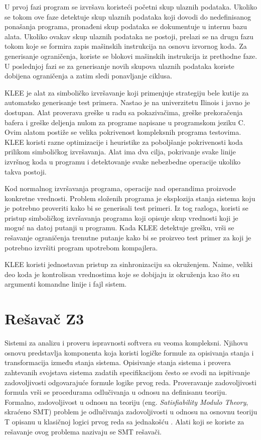 \documentclass[12pt,oneside]{memoir}
\begin{document}
U prvoj fazi program se izvršava koristeći početni skup ulaznih podataka. Ukoliko se tokom ove faze detektuje skup ulaznih podataka koji dovodi do nedefinisanog ponašanja programa, pronađeni skup podataka se dokumentuje u internu bazu alata. Ukoliko ovakav skup ulaznih podataka ne postoji, prelazi se na drugu fazu tokom koje se formira zapis mašinskih instrukcija na osnovu izvornog koda. Za generisanje ograničenja, koriste se blokovi mašinskih instrukcija iz prethodne faze. U poslednjoj fazi se za generisanje novih skupova ulaznih podataka koriste dobijena ograničenja a zatim sledi ponavljanje ciklusa. 
\par
KLEE \cite{ToolKLEE} je alat za simboličko izvršavanje \cite{SymbolicExecution} koji primenjuje strategiju bele kutije za automatsko generisanje test primera. 
Nastao je na univerzitetu Ilinois i javno je dostupan.
Alat proverava greške u radu sa pokazivačima, greške prekoračenja bafera i greške deljenja nulom za programe napisane u programskom jeziku C. Ovim alatom postiže se velika pokrivenost kompleksnih programa testovima. KLEE koristi razne optimizacije i heuristike za poboljšanje pokrivenosti koda prilikom simboličkog izvršavanja. Alat ima dva cilja, pokrivanje svake linije izvršnog koda u programu i detektovanje svake nebezbedne operacije ukoliko takva postoji. \par
Kod normalnog izvršavanja programa, operacije nad operandima proizvode konkretne vrednosti. Problem složenih programa je eksplozija stanja sistema koju je potrebno proveriti kako bi se generisali test primeri. Iz tog razloga, koristi se pristup simboličkog izvršavanja programa koji opisuje skup vrednosti koji je moguć na datoj putanji u programu. Kada KLEE detektuje grešku, vrši se rešavanje ograničenja trenutne putanje kako bi se proizveo test primer za koji je potrebno izvršiti program upotrebom kompajlera. 
\par 
KLEE koristi jednostavan pristup za sinhronizaciju sa okruženjem. Naime, veliki deo koda je kontrolisan vrednostima koje se dobijaju iz okruženja kao što su argumenti komandne linije i fajl sistem. 
 
\chapter{Rešavač Z3} \label{resavac}
\label{chp:razrada}

Sistemi za analizu i proveru ispravnosti softvera su veoma kompleksni. Njihovu osnovu predstavlja komponenta koja koristi logičke formule za opisivanja stanja i transformacija između stanja sistema. Opisivanje stanja sistema i provera zahtevanih svojstava sistema zadatih specifikacijom često se svodi na ispitivanje zadovoljivosti odgovarajuće formule logike prvog reda.
Proveravanje zadovoljivosti formula vrši se procedurama odlučivanja u odnosu na definisanu teoriju. Formalno, zadovoljivost u odnosu na teoriju (eng. \textit{Satisfiability Modulo Theory}, skraćeno SMT) problem je odlučivanja zadovoljivosti u odnosu na osnovnu teoriju T opisanu u klasičnoj logici prvog reda sa jednakošću \cite{Barrett}. Alati koji se koriste za rešavanje ovog problema nazivaju se SMT rešavači. 
\par
\end{document}
